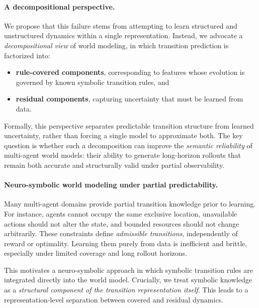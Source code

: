 \documentclass{article}
\theoremstyle{plain}
\theoremstyle{definition}
\theoremstyle{remark}
\begin{document}
\paragraph{A decompositional perspective.}
We propose that this failure stems from attempting to learn structured and unstructured dynamics within a single representation. Instead, we advocate a \emph{decompositional view} of world modeling, in which transition prediction is factorized into:
\begin{itemize}
  \item \textbf{rule-covered components}, corresponding to features whose evolution is governed by known symbolic transition rules, and
  \item \textbf{residual components}, capturing uncertainty that must be learned from data.
\end{itemize}

Formally, this perspective separates predictable transition structure from learned uncertainty, rather than forcing a single model to approximate both. The key question is whether such a decomposition can improve the \emph{semantic reliability} of multi-agent world models: their ability to generate long-horizon rollouts that remain both accurate and structurally valid under partial observability.

\paragraph{Neuro-symbolic world modeling under partial predictability.}
Many multi-agent domains provide partial transition knowledge prior to learning. For instance, agents cannot occupy the same exclusive location, unavailable actions should not alter the state, and bounded resources should not change arbitrarily. These constraints define \emph{admissible transitions}, independently of reward or optimality. Learning them purely from data is inefficient and brittle, especially under limited coverage and long rollout horizons.

This motivates a neuro-symbolic approach in which symbolic transition rules are integrated directly into the world model. Crucially, we treat symbolic knowledge as a \emph{structural component of the transition representation itself}. This leads to a representation-level separation between covered and residual dynamics.
\end{document}
